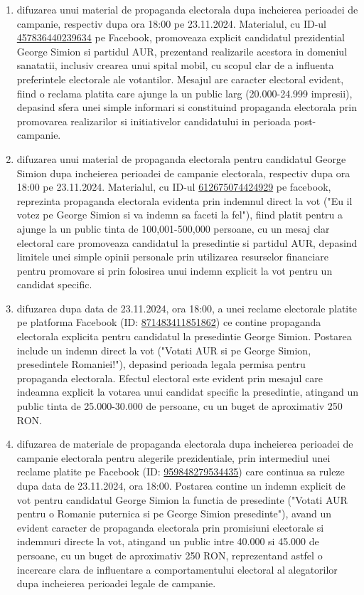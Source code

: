 \documentclass[a4paper,12pt]{article}
\begin{document}
\begin{enumerate}[leftmargin=*, label=\arabic*.)]
    \item difuzarea unui material de propaganda electorala dupa incheierea perioadei de campanie, respectiv dupa ora 18:00 pe 23.11.2024. Materialul, cu ID-ul \href{https://www.facebook.com/ads/library/?id=457836440239634}{457836440239634} pe Facebook, promoveaza explicit candidatul prezidential George Simion si partidul AUR, prezentand realizarile acestora in domeniul sanatatii, inclusiv crearea unui spital mobil, cu scopul clar de a influenta preferintele electorale ale votantilor. Mesajul are caracter electoral evident, fiind o reclama platita care ajunge la un public larg (20.000-24.999 impresii), depasind sfera unei simple informari si constituind propaganda electorala prin promovarea realizarilor si initiativelor candidatului in perioada post-campanie.
    \item difuzarea unui material de propaganda electorala pentru candidatul George Simion dupa incheierea perioadei de campanie electorala, respectiv dupa ora 18:00 pe 23.11.2024. Materialul, cu ID-ul \href{https://www.facebook.com/ads/library/?id=612675074424929}{612675074424929} pe facebook, reprezinta propaganda electorala evidenta prin indemnul direct la vot ("Eu il votez pe George Simion si va indemn sa faceti la fel"), fiind platit pentru a ajunge la un public tinta de 100,001-500,000 persoane, cu un mesaj clar electoral care promoveaza candidatul la presedintie si partidul AUR, depasind limitele unei simple opinii personale prin utilizarea resurselor financiare pentru promovare si prin folosirea unui indemn explicit la vot pentru un candidat specific.
    \item difuzarea dupa data de 23.11.2024, ora 18:00, a unei reclame electorale platite pe platforma Facebook (ID: \href{https://www.facebook.com/ads/library/?id=871483411851862}{871483411851862}) ce contine propaganda electorala explicita pentru candidatul la presedintie George Simion. Postarea include un indemn direct la vot ("Votati AUR si pe George Simion, presedintele Romaniei!"), depasind perioada legala permisa pentru propaganda electorala. Efectul electoral este evident prin mesajul care indeamna explicit la votarea unui candidat specific la presedintie, atingand un public tinta de 25.000-30.000 de persoane, cu un buget de aproximativ 250 RON.
    \item difuzarea de materiale de propaganda electorala dupa incheierea perioadei de campanie electorala pentru alegerile prezidentiale, prin intermediul unei reclame platite pe Facebook (ID: \href{https://www.facebook.com/ads/library/?id=959848279534435}{959848279534435}) care continua sa ruleze dupa data de 23.11.2024, ora 18:00. Postarea contine un indemn explicit de vot pentru candidatul George Simion la functia de presedinte ("Votati AUR pentru o Romanie puternica si pe George Simion presedinte"), avand un evident caracter de propaganda electorala prin promisiuni electorale si indemnuri directe la vot, atingand un public intre 40.000 si 45.000 de persoane, cu un buget de aproximativ 250 RON, reprezentand astfel o incercare clara de influentare a comportamentului electoral al alegatorilor dupa incheierea perioadei legale de campanie.
\end{enumerate}
\end{document}
